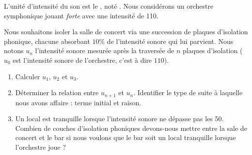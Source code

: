 
\begin{exercice}\label{exosmath-0310}

    L'unité d'intensité du son est le , noté \unit{}{\deci\bel}. Nous considérons un orchestre symphonique jouant \emph{forte} avec une  intensité de \unit{110}{\deci\bel}.

    Nous souhaitons isoler la salle de concert via une succession de plaques d'isolation phonique, chacune absorbant \( 10\%\) de l'intensité sonore qui lui parvient. Nous notons \( u_n\) l'intensité sonore mesurée après la traversée de \( n\) plaques d'isolation (\( u_0\) est l'intensité sonore de l'orchestre, c'est à dire \( 110\)).

    \begin{enumerate}
        \item
            Calculer \( u_1\), \( u_2\) et \( u_3\).
        \item
            Déterminer la relation entre \( u_{n+1} \) et \( u_n\). Identifier le type de suite à laquelle nous avons affaire : terme initial et raison.
        \item
            Un local est tranquille lorsque l'intensité sonore ne dépasse pas les \unit{50}{\deci\bel}. Combien de couches d'isolation phoniques devons-nous mettre entre la sale de concert et le bar si nous voulons que le bar soit un local tranquille lorsque l'orchestre joue ?
    \end{enumerate}

\end{exercice}

